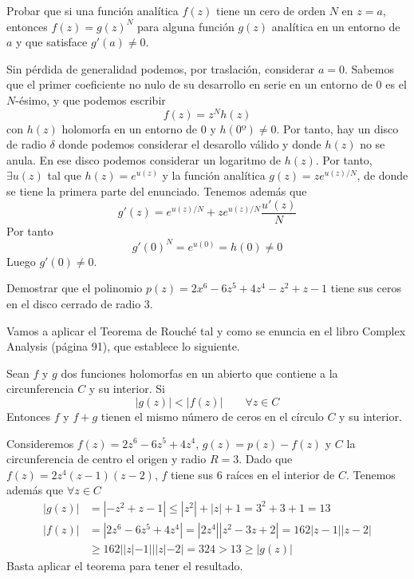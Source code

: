 \documentclass[twoside]{article}
\begin{document}
\begin{ejercicio}{4}
Probar que si una función analítica $f(z)$ tiene un cero de orden $N$ en $z=a$, entonces $f(z)=g(z)^N$ para alguna función $g(z)$ analítica en un entorno de $a$ y que satisface $g'(a)\neq 0$.
\end{ejercicio}
\begin{solucion}
Sin pérdida de generalidad podemos, por traslación, considerar $a=0$. Sabemos que el primer coeficiente no nulo de su desarrollo en serie en un entorno de $0$ es el $N$-ésimo, y que podemos escribir
$$
f(z) = z^Nh(z)
$$
con $h(z)$ holomorfa en un entorno de $0$ y $h(0º)\neq 0$. Por tanto, hay un disco de radio $\delta$ donde podemos considerar el desarollo válido y donde $h(z)$ no se anula. En ese disco podemos considerar un logaritmo de $h(z)$. Por tanto, $\exists u(z)$ tal que $h(z)=e^{u(z)}$ y la función analítica $g(z)=ze^{u(z)/N}$, de donde se tiene la primera parte del enunciado. Tenemos además que
$$
g'(z)=e^{u(z)/N}+ze^{u(z)/N}\frac{u'(z)}{N}
$$
Por tanto
$$
g'(0)^N = e^{u(0)} = h(0) \neq 0
$$
Luego $g'(0)\neq 0$.
\end{solucion}
\newpage

\begin{ejercicio}{5}
Demostrar que el polinomio $p(z)=2x^6-6z^5+4z^4-z^2+z-1$ tiene sus ceros en el disco cerrado de radio $3$.
\begin{solucion}
Vamos a aplicar el Teorema de Rouché tal y como se enuncia en el libro Complex Analysis (página 91), que establece lo siguiente.
\begin{theorem}
Sean $f$ y $g$ dos funciones holomorfas en un abierto que contiene a la circunferencia $C$ y su interior. Si 
$$|g(z)|<|f(z)| \qquad \forall z \in C
$$
Entonces $f$ y $f+g$ tienen el mismo número de ceros en el  círculo $C$ y su interior. 
\end{theorem}
Consideremos $f(z)=2z^6-6z^5+4z^4$, $g(z)=p(z)-f(z)$ y $C$ la circunferencia de centro el origen y radio $R=3$. Dado que $f(z)=2z^4(z-1)(z-2)$, $f$ tiene sus 6 raíces en el interior de $C$. Tenemos además que $\forall z \in C$ 
\begin{align*}
|g(z)|&=|-z^2+z-1|\leq |z^2|+|z|+1 = 3^2+3+1=13\\
|f(z)|&=|2z^6-6z^5+4z^4|=|2z^4||z^2-3z+2|=162|z-1||z-2|\\
&\geq 162||z|-1|||z|-2| = 324 > 13 \geq |g(z)|
\end{align*}
Basta aplicar el teorema para tener el resultado.
\end{solucion}
\end{ejercicio}
\end{document}
